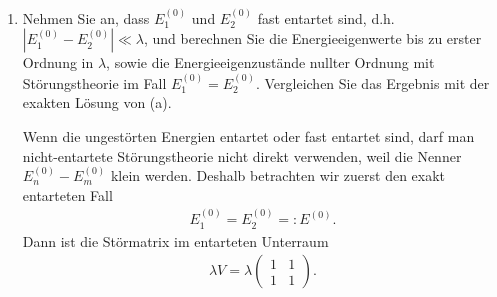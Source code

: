 \documentclass[11pt,a4paper]{scrartcl}
\newcommand{\abs}[1]{\left| #1 \right|}
\begin{document}
\begin{enumerate}[label=(\alph*)]
\begin{calculationbox}
            \begin{solutionbox}
                Der Vergleich mit der exakten Lösung aus (a) funktioniert durch Entwicklung der Wurzel für $\abs{\lambda}\ll\abs{\Delta}$. Für $\Delta>0$ gilt zum Beispiel
                \begin{align*}
                    \sqrt{\left(\frac{\Delta}{2}\right)^2+\lambda^2}
                    =
                    \frac{\Delta}{2}
                    \sqrt{1+\frac{4\lambda^2}{\Delta^2}}
                    =
                    \frac{\Delta}{2}
                    +
                    \frac{\lambda^2}{\Delta}
                    +
                    \mathcal O(\lambda^4).
                \end{align*}
                Einsetzen liefert genau die Energien aus der Störungstheorie. Auch die Eigenzustände stimmen überein, wenn man die exakten Koeffizienten $q_\pm$ bis zur ersten Ordnung in $\lambda$ entwickelt.
            \end{solutionbox}
        \end{calculationbox}

        \item Nehmen Sie an, dass $E_1^{(0)}$ und $E_2^{(0)}$ fast entartet sind, d.h. $\abs{E_1^{(0)}-E_2^{(0)}}\ll \lambda$, und berechnen Sie die Energieeigenwerte bis zu erster Ordnung in $\lambda$, sowie die Energieeigenzustände nullter Ordnung mit Störungstheorie im Fall $E_1^{(0)}=E_2^{(0)}$. Vergleichen Sie das Ergebnis mit der exakten Lösung von (a).

        \begin{calculationbox}
            \begin{solutionbox}
                Wenn die ungestörten Energien entartet oder fast entartet sind, darf man nicht-entartete Störungstheorie nicht direkt verwenden, weil die Nenner $E_n^{(0)}-E_m^{(0)}$ klein werden. Deshalb betrachten wir zuerst den exakt entarteten Fall
                \begin{align*}
                    E_1^{(0)}=E_2^{(0)}=:E^{(0)}.
                \end{align*}
                Dann ist die Störmatrix im entarteten Unterraum
                \begin{align*}
                    \lambda V
                    =
                    \lambda
                    \begin{pmatrix}
                        1&1\\
                        1&1
                    \end{pmatrix}.
                \end{align*}
            \end{solutionbox}


\end{calculationbox}
\end{enumerate}
\end{document}
